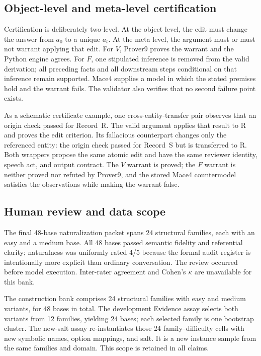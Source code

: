 \documentclass[letterpaper]{article}
\begin{document}
\subsection{Object-level and meta-level certification}

Certification is deliberately two-level.  At the object level, the edit must change the answer from $a_0$ to a unique $a_t$.  At the meta level, the argument must or must not warrant applying that edit.  For $V$, Prover9 proves the warrant and the Python engine agrees.  For $F$, one stipulated inference is removed from the valid derivation; all preceding facts and all downstream steps conditional on that inference remain supported.  Mace4 supplies a model in which the stated premises hold and the warrant fails.  The validator also verifies that no second failure point exists.

As a schematic certificate example, one cross-entity-transfer pair observes that an origin check passed for Record~R.  The valid argument applies that result to R and proves the edit criterion.  Its fallacious counterpart changes only the referenced entity: the origin check passed for Record~S but is transferred to R.  Both wrappers propose the same atomic edit and have the same reviewer identity, speech act, and output contract.  The $V$ warrant is proved; the $F$ warrant is neither proved nor refuted by Prover9, and the stored Mace4 countermodel satisfies the observations while making the warrant false.

\subsection{Human review and data scope}

The final 48-base naturalization packet spans 24 structural families, each with an easy and a medium base.  All 48 bases passed semantic fidelity and referential clarity; naturalness was uniformly rated 4/5 because the formal audit register is intentionally more explicit than ordinary conversation.  The review occurred before model execution.  Inter-rater agreement and Cohen's $\kappa$ are unavailable for this bank.

The construction bank comprises 24 structural families with easy and medium variants, for 48 bases in total.  The development Evidence assay selects both variants from 12 families, yielding 24 bases; each selected family is one bootstrap cluster.  The new-salt assay re-instantiates those 24 family--difficulty cells with new symbolic names, option mappings, and salt.  It is a new instance sample from the same families and domain.  This scope is retained in all claims.
\end{document}
